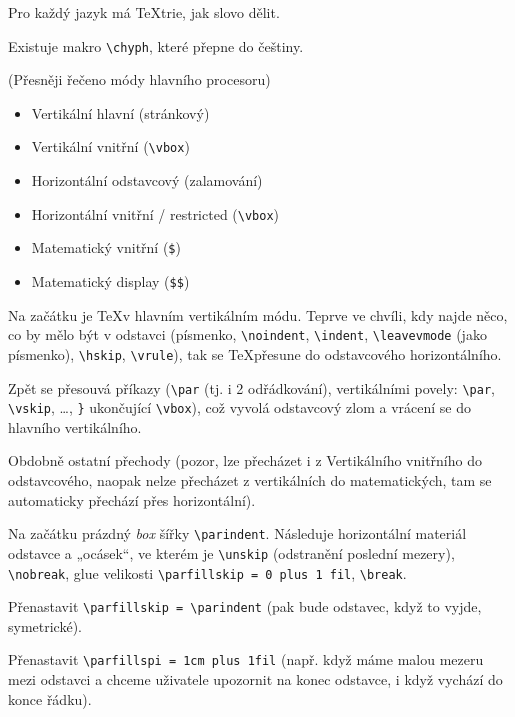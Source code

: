 \documentclass[12pt]{article}					%
\begin{document}
    \begin{definice}
        Pro každý jazyk má \TeX trie, jak slovo dělit.

        Existuje makro \verb|\chyph|, které přepne do češtiny.
    \end{definice}


    \begin{definice}
        (Přesněji řečeno módy hlavního procesoru)
        \begin{itemize}
            \item Vertikální hlavní (stránkový)
            \item Vertikální vnitřní (\verb|\vbox|)
            \item Horizontální odstavcový (zalamování)
            \item Horizontální vnitřní / restricted (\verb|\vbox|)
            \item Matematický vnitřní (\verb|$|)
            \item Matematický display (\verb|$$|)
        \end{itemize}

        Na začátku je \TeX v hlavním vertikálním módu. Teprve ve chvíli, kdy najde něco, co by mělo být v odstavci (písmenko, \verb|\noindent|, \verb|\indent|, \verb|\leavevmode| (jako písmenko), \verb|\hskip|, \verb|\vrule|), tak se \TeX přesune do odstavcového horizontálního.

        Zpět se přesouvá příkazy (\verb|\par| (tj. i 2 odřádkování), vertikálními povely: \verb|\par|, \verb|\vskip|, …, \verb|}| ukončující \verb|\vbox|), což vyvolá odstavcový zlom a vrácení se do hlavního vertikálního.

        Obdobně ostatní přechody (pozor, lze přecházet i z Vertikálního vnitřního do odstavcového, naopak nelze přecházet z vertikálních do matematických, tam se automaticky přechází přes horizontální).
    \end{definice}
    
    \begin{poznamka}
        Na začátku prázdný \emph{box} šířky \verb|\parindent|. Následuje horizontální materiál odstavce a „ocásek“, ve kterém je \verb|\unskip| (odstranění poslední mezery), \verb|\nobreak|, glue velikosti \verb|\parfillskip = 0 plus 1 fil|, \verb|\break|. 
        
        \begin{poznamkain}[Co lze]
            Přenastavit \verb|\parfillskip = \parindent| (pak bude odstavec, když to vyjde, symetrické).

            Přenastavit \verb|\parfillspi = 1cm plus 1fil| (např. když máme malou mezeru mezi odstavci a chceme uživatele upozornit na konec odstavce, i když vychází do konce řádku).
        \end{poznamkain}
    \end{poznamka}
\end{document}
